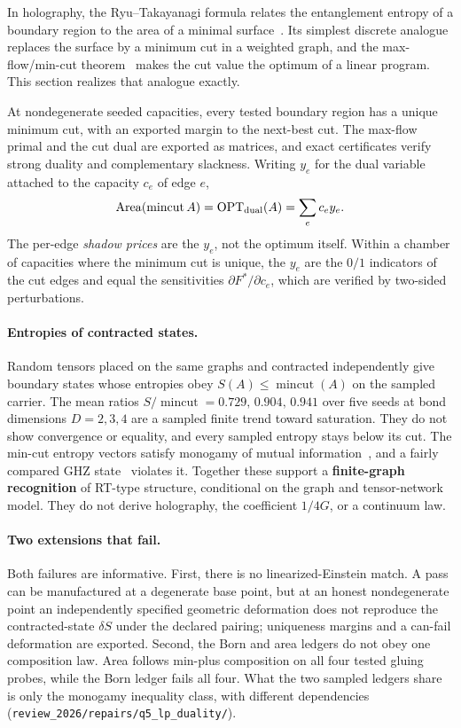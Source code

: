 \documentclass[11pt]{article}
\theoremstyle{definition}
\begin{document}
In holography, the Ryu--Takayanagi formula relates the entanglement entropy of a boundary region to the area of a
minimal surface~\citep{RyuTakayanagi2006,Maldacena1998}. Its simplest discrete analogue replaces the surface by a
minimum cut in a weighted graph, and the max-flow/min-cut theorem~\citep{FordFulkerson1956} makes the cut value the
optimum of a linear program. This section realizes that analogue exactly.

At nondegenerate seeded capacities, every tested boundary region has a unique minimum cut, with an exported margin to
the next-best cut. The max-flow primal and the cut dual are exported as matrices, and exact certificates verify strong
duality and complementary slackness. Writing \(y_e\) for the dual variable attached to the capacity \(c_e\) of edge
\(e\),
\[
\operatorname{Area}(\operatorname{mincut}A)
=\operatorname{OPT}_{\rm dual}(A)
=\sum_e c_e y_e .
\]
The per-edge \emph{shadow prices} are the \(y_e\), not the optimum itself. Within a chamber of capacities where the
minimum cut is unique, the \(y_e\) are the \(0/1\) indicators of the cut edges and equal the sensitivities
\(\partial F^*/\partial c_e\), which are verified by two-sided perturbations.

\paragraph{Entropies of contracted states.} Random tensors placed on the same graphs and contracted independently give
boundary states whose entropies obey \(S(A)\le\operatorname{mincut}(A)\) on the sampled carrier. The mean
ratios \(S/\operatorname{mincut}=0.729,\,0.904,\,0.941\) over five seeds at bond dimensions \(D=2,3,4\) are a sampled finite trend toward
saturation. They do not show convergence or equality, and every sampled entropy stays below its cut. The min-cut entropy
vectors satisfy monogamy of mutual information~\citep{HaydenHeadrickMaloney2013}, and a fairly compared GHZ
state~\citep{GHZ1989} violates it. Together these support a \textbf{finite-graph recognition} of RT-type structure,
conditional on the graph and tensor-network model. They do not derive holography, the coefficient \(1/4G\), or a
continuum law.

\paragraph{Two extensions that fail.} Both failures are informative. First, there is no linearized-Einstein match. A
pass can be manufactured at a degenerate base point, but at an honest nondegenerate point an independently specified
geometric deformation does not reproduce the contracted-state \(\delta S\) under the declared pairing; uniqueness
margins and a can-fail deformation are exported. Second, the Born and area ledgers do not obey one composition law.
Area follows min-plus composition on all four tested gluing probes, while the Born ledger fails all four. What the two
sampled ledgers share is only the monogamy inequality class, with different dependencies
(\nolinkurl{review_2026/repairs/q5_lp_duality/}).
\end{document}
